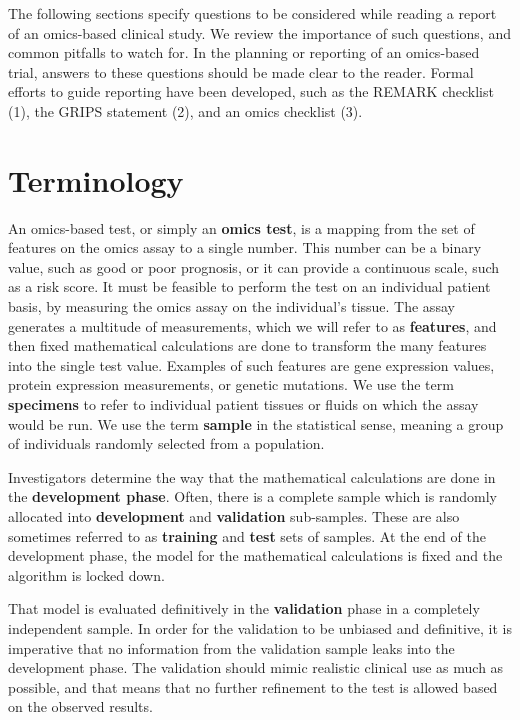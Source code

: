 \documentclass[11pt]{article}
\begin{document}
The following sections specify questions to be considered while reading
a report of an omics-based clinical study. We review the importance of
such questions, and common pitfalls to watch for. In the planning or
reporting of an omics-based trial, answers to these questions should be
made clear to the reader. Formal efforts to guide reporting have been
developed, such as the REMARK checklist (1), the GRIPS statement (2),
and an omics checklist (3).

\section{Terminology}\label{terminology}

An omics-based test, or simply an \textbf{omics test}, is a mapping from
the set of features on the omics assay to a single number. This number
can be a binary value, such as good or poor prognosis, or it can provide
a continuous scale, such as a risk score. It must be feasible to perform
the test on an individual patient basis, by measuring the omics assay on
the individual's tissue. The assay generates a multitude of
measurements, which we will refer to as \textbf{features}, and then
fixed mathematical calculations are done to transform the many features
into the single test value. Examples of such features are gene
expression values, protein expression measurements, or genetic
mutations. We use the term \textbf{specimens} to refer to individual
patient tissues or fluids on which the assay would be run. We use the
term \textbf{sample} in the statistical sense, meaning a group of
individuals randomly selected from a population.

Investigators determine the way that the mathematical calculations are
done in the \textbf{development phase}. Often, there is a complete
sample which is randomly allocated into \textbf{development} and
\textbf{validation} sub-samples. These are also sometimes referred to as
\textbf{training} and \textbf{test} sets of samples. At the end of the
development phase, the model for the mathematical calculations is fixed
and the algorithm is locked down.

That model is evaluated definitively in the \textbf{validation} phase in
a completely independent sample. In order for the validation to be
unbiased and definitive, it is imperative that no information from the
validation sample leaks into the development phase. The validation
should mimic realistic clinical use as much as possible, and that means
that no further refinement to the test is allowed based on the observed
results.
\end{document}
